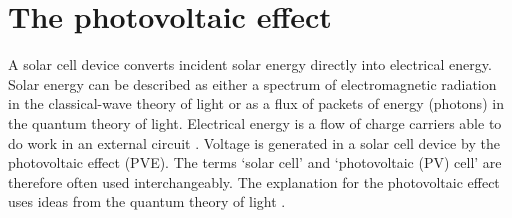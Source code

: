 \documentclass[11pt, twoside]{report}
\begin{document}


\section{The photovoltaic effect}
A solar cell device converts incident solar energy directly into electrical energy. Solar energy can be described as either a spectrum of electromagnetic radiation in the classical-wave theory of light or as a flux of packets of energy (photons) in the quantum theory of light. Electrical energy is a flow of charge carriers able to do work in an external circuit \cite{spatial_resolved_book}. Voltage is generated in a solar cell device by the photovoltaic effect (PVE). The terms `solar cell' and `photovoltaic (PV) cell' are therefore often used interchangeably. The explanation for the photovoltaic effect uses ideas from the quantum theory of light \cite{Nelson1}.
\end{document}
